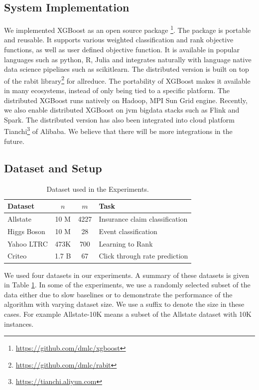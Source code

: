 \documentclass[sigconf]{acmart}
\begin{document}
\subsection{System Implementation}
\label{subsec:System Implementation}
We implemented XGBoost as an open source package \footnote{\url{https://github.com/dmlc/xgboost}}. The package is portable and reusable. It supports various
weighted classification and rank objective functions, as well as user defined objective function. It is available in popular
languages such as python, R, Julia and integrates naturally with language native data science pipelines such as scikitlearn.
The distributed version is built on top of the rabit library\footnote{\url{https://github.com/dmlc/rabit}} for allreduce. The portability of XGBoost makes it
available in many ecosystems, instead of only being tied to a specific platform. The distributed XGBoost runs natively
on Hadoop, MPI Sun Grid engine. Recently, we also enable distributed XGBoost on jvm bigdata stacks such as Flink
and Spark. The distributed version has also been integrated into cloud platform Tianchi\footnote{\url{https://tianchi.aliyun.com}} of Alibaba. We believe that
there will be more integrations in the future.

\subsection{Dataset and Setup}
\label{subsec:Dataset and Setup}

\begin{table}[t]
    \centering
    \caption{Dataset used in the Experiments.}
    \begin{tabular}{|l|c|c|l|}
        \hline
        Dataset & $n$ & $m$ & Task \\ \hline
        Allstate & 10 M & 4227 & Insurance claim classification \\ \hline
        Higgs Boson & 10 M & 28 & Event classification \\ \hline
        Yahoo LTRC & 473K & 700 & Learning to Rank \\ \hline
        Criteo & 1.7 B & 67 & Click through rate prediction \\ \hline
    \end{tabular}
    \label{tab:Table2}
\end{table}

We used four datasets in our experiments. A summary of these datasets is given in Table \ref{tab:Table2}. In some of the experiments, we use 
a randomly selected subset of the data either due to slow baselines or to demonstrate the performance of the algorithm with 
varying dataset size. We use a suffix to denote the size in these cases. For example Allstate-10K
means a subset of the Allstate dataset with 10K instances. 
\end{document}
